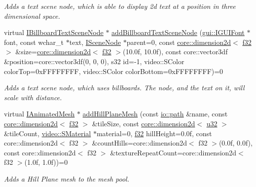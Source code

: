 \begin{DoxyCompactItemize}
\begin{DoxyCompactList}\small\item\em Adds a text scene node, which is able to display 2d text at a position in three dimensional space. \end{DoxyCompactList}\item 
virtual \hyperlink{classirr_1_1scene_1_1IBillboardTextSceneNode}{I\+Billboard\+Text\+Scene\+Node} $\ast$ \hyperlink{classirr_1_1scene_1_1ISceneManager_a82e91e414ac6ad4f4c0eaa5b17ce3a44}{add\+Billboard\+Text\+Scene\+Node} (\hyperlink{classirr_1_1gui_1_1IGUIFont}{gui\+::\+I\+G\+U\+I\+Font} $\ast$font, const wchar\+\_\+t $\ast$text, \hyperlink{classirr_1_1scene_1_1ISceneNode}{I\+Scene\+Node} $\ast$parent=0, const \hyperlink{classirr_1_1core_1_1dimension2d}{core\+::dimension2d}$<$ \hyperlink{namespaceirr_a0277be98d67dc26ff93b1a6a1d086b07}{f32} $>$ \&size=\hyperlink{classirr_1_1core_1_1dimension2d}{core\+::dimension2d}$<$ \hyperlink{namespaceirr_a0277be98d67dc26ff93b1a6a1d086b07}{f32} $>$(10.\+0f, 10.\+0f), const core\+::vector3df \&position=core\+::vector3df(0, 0, 0), s32 id=-\/1, video\+::\+S\+Color color\+Top=0x\+F\+F\+F\+F\+F\+F\+F\+F, video\+::\+S\+Color color\+Bottom=0x\+F\+F\+F\+F\+F\+F\+F\+F)=0
\begin{DoxyCompactList}\small\item\em Adds a text scene node, which uses billboards. The node, and the text on it, will scale with distance. \end{DoxyCompactList}\item 
virtual \hyperlink{classirr_1_1scene_1_1IAnimatedMesh}{I\+Animated\+Mesh} $\ast$ \hyperlink{classirr_1_1scene_1_1ISceneManager_a2eb986c6975ebc1aa1f68c878ac8dcda}{add\+Hill\+Plane\+Mesh} (const \hyperlink{namespaceirr_1_1io_a6468281622ce3a1c46b72e19f32dded5}{io\+::path} \&name, const \hyperlink{classirr_1_1core_1_1dimension2d}{core\+::dimension2d}$<$ \hyperlink{namespaceirr_a0277be98d67dc26ff93b1a6a1d086b07}{f32} $>$ \&tile\+Size, const \hyperlink{classirr_1_1core_1_1dimension2d}{core\+::dimension2d}$<$ \hyperlink{namespaceirr_a0416a53257075833e7002efd0a18e804}{u32} $>$ \&tile\+Count, \hyperlink{classirr_1_1video_1_1SMaterial}{video\+::\+S\+Material} $\ast$material=0, \hyperlink{namespaceirr_a0277be98d67dc26ff93b1a6a1d086b07}{f32} hill\+Height=0.\+0f, const core\+::dimension2d$<$ f32 $>$ \&count\+Hills=core\+::dimension2d$<$ f32 $>$(0.\+0f, 0.\+0f), const core\+::dimension2d$<$ f32 $>$ \&texture\+Repeat\+Count=core\+::dimension2d$<$ f32 $>$(1.\+0f, 1.\+0f))=0
\begin{DoxyCompactList}\small\item\em Adds a Hill Plane mesh to the mesh pool. \end{DoxyCompactList}\item 

\end{DoxyCompactItemize}
